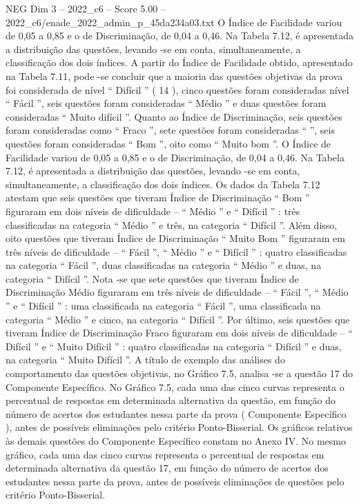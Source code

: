 \begin{textsample}{NEG Dim 3 – 2022\_c6 – Score 5.00 – 2022\_c6/enade\_2022\_admin\_p\_45da234a03.txt}
O Índice de Facilidade variou de 0,05 a 0,85 e o de Discriminação, de 0,04 a 0,46.
Na Tabela 7.12, é apresentada a distribuição das questões, levando -se em conta, simultaneamente, a classificação dos dois índices.
A partir do Índice de Facilidade obtido, apresentado na Tabela 7.11, pode -se concluir que a maioria das questões objetivas da prova foi considerada de nível “ Difícil ” ( 14 ), cinco questões foram consideradas nível “ Fácil ”, seis questões foram consideradas “ Médio ” e duas questões foram consideradas “ Muito difícil ”.
Quanto ao Índice de Discriminação, seis questões foram consideradas como “ Fraco ”, sete questões foram consideradas “ ”, seis questões foram consideradas “ Bom ”, oito como “ Muito bom ”.
O Índice de Facilidade variou de 0,05 a 0,85 e o de Discriminação, de 0,04 a 0,46.
Na Tabela 7.12, é apresentada a distribuição das questões, levando -se em conta, simultaneamente, a classificação dos dois índices.
Os dados da Tabela 7.12 atestam que seis questões que tiveram Índice de Discriminação “ Bom ” figuraram em dois níveis de dificuldade – “ Médio ” e “ Difícil ” : três classificadas na categoria “ Médio ” e três, na categoria “ Difícil ”.
Além disso, oito questões que tiveram Índice de Discriminação “ Muito Bom ” figuraram em três níveis de dificuldade – “ Fácil ”, “ Médio ” e “ Difícil ” : quatro classificadas na categoria “ Fácil ”, duas classificadas na categoria “ Médio ” e duas, na categoria “ Difícil ”.
Nota -se que sete questões que tiveram Índice de Discriminação Médio figuraram em três níveis de dificuldade – “ Fácil ”, “ Médio ” e “ Difícil ” : uma classificada na categoria “ Fácil ”, uma classificada na categoria “ Médio ” e cinco, na categoria “ Difícil ”.
Por último, seis questões que tiveram Índice de Discriminação Fraco figuraram em dois níveis de dificuldade – “ Difícil ” e “ Muito Difícil ” : quatro classificadas na categoria “ Difícil ” e duas, na categoria “ Muito Difícil ”.
A título de exemplo das análises do comportamento das questões objetivas, no Gráfico 7.5, analisa -se a questão 17 do Componente Específico.
No Gráfico 7.5, cada uma das cinco curvas representa o percentual de respostas em determinada alternativa da questão, em função do número de acertos dos estudantes nessa parte da prova ( Componente Específico ), antes de possíveis eliminações pelo critério Ponto-Bisserial.
Os gráficos relativos às demais questões do Componente Específico constam no Anexo IV.
No mesmo gráfico, cada uma das cinco curvas representa o percentual de respostas em determinada alternativa da questão 17, em função do número de acertos dos estudantes nessa parte da prova, antes de possíveis eliminações de questões pelo critério Ponto-Bisserial.

\end{textsample}
